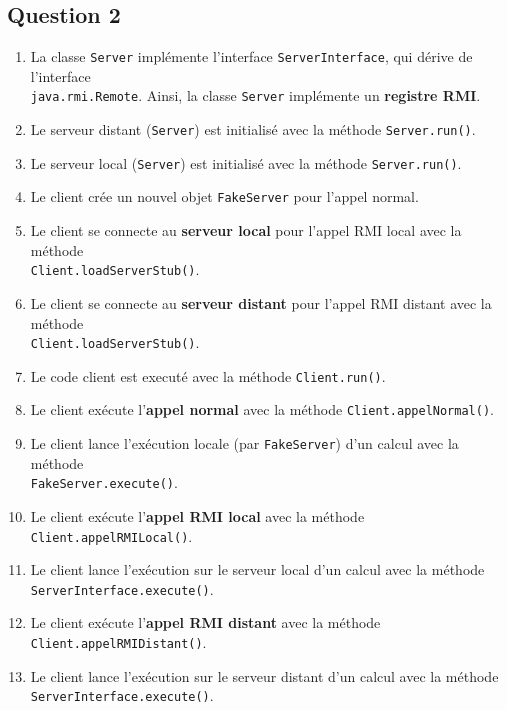\documentclass[12pt,letterpaper]{article}
\begin{document}
\subsection*{Question 2}
\begin{enumerate}
  \item La classe \texttt{Server} implémente l'interface \texttt{ServerInterface}, qui dérive de l'interface \\
        \texttt{java.rmi.Remote}. Ainsi, la classe \texttt{Server} implémente un \textbf{registre RMI}.
  \item Le serveur distant (\texttt{Server}) est initialisé avec la méthode \texttt{Server.run()}.
  \item Le serveur local (\texttt{Server}) est initialisé avec la méthode \texttt{Server.run()}.
  \item Le client crée un nouvel objet \texttt{FakeServer} pour l'appel normal.
  \item Le client se connecte au \textbf{serveur local} pour l'appel RMI local avec la méthode \\
        \texttt{Client.loadServerStub()}.
  \item Le client se connecte au \textbf{serveur distant} pour l'appel RMI distant avec la méthode \\
        \texttt{Client.loadServerStub()}.
  \item Le code client est executé avec la méthode \texttt{Client.run()}.
  \item Le client exécute l'\textbf{appel normal} avec la méthode \texttt{Client.appelNormal()}.
  \item Le client lance l'exécution locale (par \texttt{FakeServer}) d'un calcul avec la méthode \\
        \texttt{FakeServer.execute()}.
  \item Le client exécute l'\textbf{appel RMI local} avec la méthode \texttt{Client.appelRMILocal()}.
  \item Le client lance l'exécution sur le serveur local d'un calcul avec la méthode \\
        \texttt{ServerInterface.execute()}.
  \item Le client exécute l'\textbf{appel RMI distant} avec la méthode \texttt{Client.appelRMIDistant()}.
  \item Le client lance l'exécution sur le serveur distant d'un calcul avec la méthode \\
        \texttt{ServerInterface.execute()}.
\end{enumerate}
\end{document}
